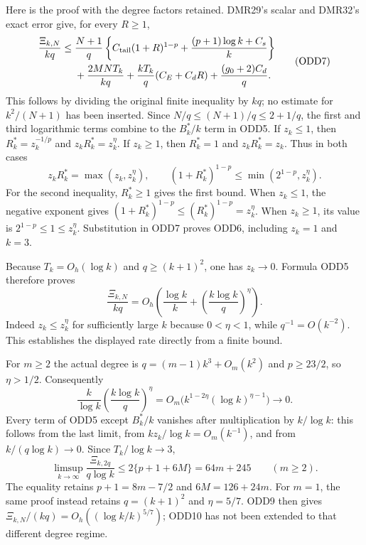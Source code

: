 \documentclass[11pt,a4paper]{article}
\begin{document}
Here is the proof with the degree factors retained. DMR29's
scalar and DMR32's exact error give, for every $R\geq1$,
\[
\begin{split}
 \frac{\Xi_{k,N}}{kq}\leq{}&
 \frac{N+1}{q}\left\{C_{\rm tail}(1+R)^{1-p}
                +\frac{(p+1)\log k+C_s}{k}\right\}\\
 &+\frac{2MN T_k}{kq}
       +\frac{kT_k}{q}(C_E+C_dR)+\frac{(g_0+2)C_d}{q}.
\end{split}\tag{ODD7}
\]
This follows by dividing the original finite inequality by $kq$;
no estimate for $k^2/(N+1)$ has been inserted. Since
$N/q\leq(N+1)/q\leq2+1/q$, the first and third logarithmic
terms combine to the $B_k^*/k$ term in ODD5. If $z_k\leq1$,
then $R_k^*=z_k^{-1/p}$ and
$z_kR_k^*=z_k^\eta$. If $z_k\geq1$, then $R_k^*=1$ and
$z_kR_k^*=z_k$. Thus in both cases
\[
 z_kR_k^*=\max(z_k,z_k^\eta),\qquad
 (1+R_k^*)^{1-p}\leq\min(2^{1-p},z_k^\eta).
 \tag{ODD8}
\]
For the second inequality, $R_k^*\geq1$ gives the first
bound. When $z_k\leq1$, the negative exponent gives
$(1+R_k^*)^{1-p}\leq(R_k^*)^{1-p}=z_k^\eta$.
When $z_k\geq1$, its value is $2^{1-p}\leq1\leq z_k^\eta$.
Substitution in ODD7 proves ODD6, including $z_k=1$ and $k=3$.

Because $T_k=O_h(\log k)$ and $q\geq(k+1)^2$, one has
$z_k\to0$. Formula ODD5 therefore proves
\[
 \frac{\Xi_{k,N}}{kq}
 =O_h\left(\frac{\log k}{k}
                   +\left(\frac{k\log k}{q}\right)^\eta\right).
 \tag{ODD9}
\]
Indeed $z_k\leq z_k^\eta$ for sufficiently large $k$ because
$0<\eta<1$, while $q^{-1}=O(k^{-2})$. This establishes
the displayed rate directly from a finite bound.

For $m\geq2$ the actual degree is
$q=(m-1)k^3+O_m(k^2)$ and $p\geq23/2$, so $\eta>1/2$.
Consequently
\[
 \frac{k}{\log k}\left(\frac{k\log k}{q}\right)^\eta
 =O_m\bigl(k^{1-2\eta}(\log k)^{\eta-1}\bigr)\longrightarrow0.
\]
Every term of ODD5 except $B_k^*/k$ vanishes after multiplication
by $k/\log k$: this follows from the last limit, from
$kz_k/\log k=O_m(k^{-1})$, and from
$k/(q\log k)\to0$. Since $T_k/\log k\to3$,
\[
 \boxed{\quad
 \limsup_{k\to\infty}\frac{\Xi_{k,2q}}{q\log k}
 \leq2\{p+1+6M\}=64m+245\qquad(m\geq2).
 \quad}\tag{ODD10}
\]
The equality retains $p+1=8m-7/2$ and $6M=126+24m$.
For $m=1$, the same proof instead retains
$q=(k+1)^2$ and $\eta=5/7$. ODD9 then gives
$\Xi_{k,N}/(kq)=O_h((\log k/k)^{5/7})$; ODD10 has
not been extended to that different degree regime.
\end{document}
